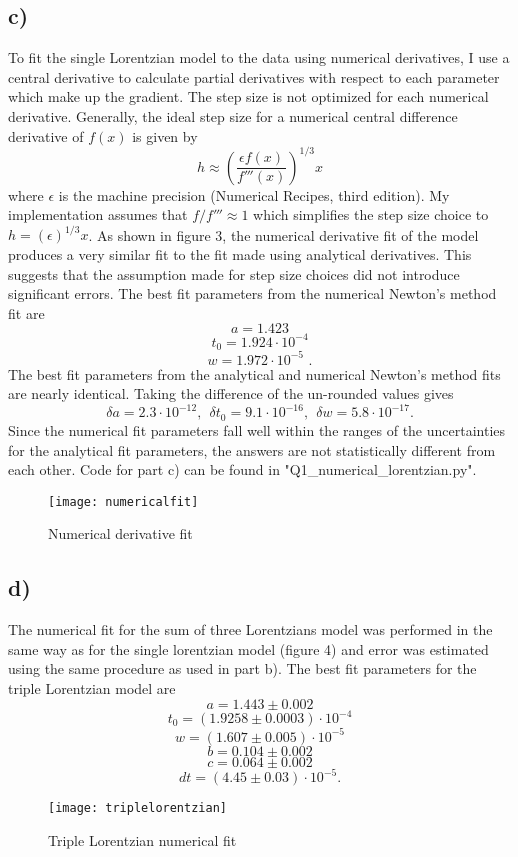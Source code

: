 \documentclass{article}
\newcommand{\<}[1]{\left\langle #1 \right\rangle }
\begin{document}
\subsection{c)}
To fit the single Lorentzian model to the data using numerical derivatives, I use a central derivative to calculate partial derivatives with respect to each parameter which make up the gradient. The step size is not optimized for each numerical derivative. Generally, the ideal step size for a numerical central difference derivative of $f(x)$ is given by
\[h \approx \left(\frac{\epsilon f(x)}{f'''(x)}\right)^{1/3} x\]
where $\epsilon$ is the machine precision (Numerical Recipes, third edition). My implementation assumes that $f/f''' \approx 1$ which simplifies the step size choice to $h = (\epsilon)^{1/3}x$. As shown in figure 3, the numerical derivative fit of the model produces a very similar fit to the fit made using analytical derivatives. This suggests that the assumption made for step size choices did not introduce significant errors. The best fit parameters from the numerical Newton's method fit are
\[a = 1.423\]
\[t_0 = 1.924 \cdot 10^{-4}\]
\[w = 1.972 \cdot 10^{-5} \text{ .}\]
The best fit parameters from the analytical and numerical Newton's method fits are nearly identical. Taking the difference of the un-rounded values gives
\[\delta a = 2.3 \cdot 10^{-12}, \ \ \delta t_0 = 9.1\cdot 10^{-16}, \ \ \delta w = 5.8 \cdot 10^{-17} .\]
Since the numerical fit parameters fall well within the ranges of the uncertainties for the analytical fit parameters, the answers are not statistically different from each other. Code for part c) can be found in "Q1\_numerical\_lorentzian.py".
\begin{figure}[h]
	\caption{Numerical derivative fit}
	\centering
	\texttt{[image: numericalfit]}
\end{figure}

\subsection{d)}
The numerical fit for the sum of three Lorentzians model was performed in the same way as for the single lorentzian model (figure 4) and error was estimated using the same procedure as used in part b). The best fit parameters for the triple Lorentzian model are
\[a = 1.443 \pm 0.002\]
\[t_0 = (1.9258 \pm 0.0003)\cdot 10^{-4}\]
\[w = (1.607 \pm 0.005 ) \cdot 10^{-5} \]
\[b = 0.104 \pm 0.002 \]
\[c =  0.064 \pm 0.002\]
\[dt = (4.45 \pm 0.03) \cdot 10^{-5}. \]
\begin{figure}[h]
	\caption{Triple Lorentzian numerical fit}
	\centering
	\texttt{[image: triplelorentzian]}
\end{figure}
\end{document}
